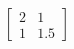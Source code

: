 \documentclass[preview]{standalone}
\begin{document}
\begin{align*}
\begin{bmatrix} 2 & 1 \\ 1 & 1.5 \end{bmatrix}
\end{align*}
\end{document}
